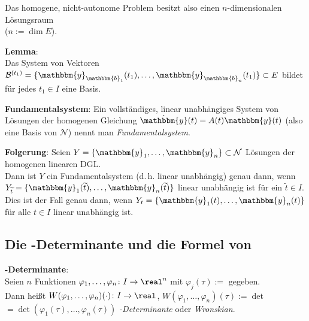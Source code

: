 Das homogene, nicht-autonome Problem besitzt also einen $n$-dimensionalen
Lösungsraum \\
($n := \dim E$).

\textbf{Lemma}: \\
Das System von Vektoren
$\mathcal{B}^{(t_1)} = \{\mathbbm{y}_{\mathbbm{b}_1}(t_1), \dotsc,
\mathbbm{y}_{\mathbbm{b}_n}(t_1)\} \subset E$ bildet für jedes $t_1 \in I$
eine Basis.

\textbf{Fundamentalsystem}:
Ein vollständiges, linear unabhängiges System von Lösungen der homogenen
Gleichung $\dot{\mathbbm{y}}(t) = A(t) \mathbbm{y}(t)$
(also eine Basis von $\mathcal{N}$) nennt man \emph{Fundamentalsystem}.

\textbf{Folgerung}:
Seien $Y = \{\mathbbm{y}_1, \dotsc, \mathbbm{y}_n\} \subset \mathcal{N}$
Lösungen der homogenen linearen DGL. \\
Dann ist $Y$ ein Fundamentalsystem (d.\,h. linear unabhängig)
genau dann, wenn \\
$Y_{\widetilde{t}} = \{\mathbbm{y}_1(\widetilde{t}), \dotsc,
\mathbbm{y}_n(\widetilde{t})\}$
linear unabhängig ist für ein $\widetilde{t} \in I$.
Dies ist der Fall genau dann, wenn
$Y_t = \{\mathbbm{y}_1(t), \dotsc, \mathbbm{y}_n(t)\}$
für alle $t \in I$ linear unabhängig ist.

\subsection{%
    Die -Determinante und die Formel von %
}

\textbf{-Determinante}: \\
Seien $n$ Funktionen
$\varphi_1, \dotsc, \varphi_n\colon I \rightarrow \real^n$ mit
$\varphi_j(\tau) :=$
gegeben. \\
Dann heißt
$W(\varphi_1, \dotsc, \varphi_n)(\cdot)\colon I \rightarrow \real$,
$W(\varphi_1, \dotsc, \varphi_n)(\tau) := \det$
 \\
$ = \det(\varphi_1(\tau), \dotsc, \varphi_n(\tau))$
\emph{-Determinante} oder \emph{Wronskian}.

